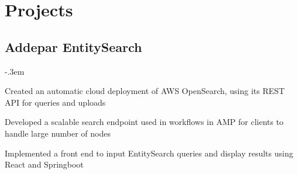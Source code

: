 \documentclass{article}
\let\olditemize=\itemize \let\endolditemize=\enditemize
\renewenvironment{itemize}{\olditemize[topsep=0em] \itemsep-.3em}{\endolditemize}
\newcommand{\entry}[3]{\quad\textbf{|\quad#1}\\#2\qquad#3}
\begin{document}

%
%

\section{Projects}

\subsection{Addepar EntitySearch}
\begin{itemize}
  \item Created an automatic cloud deployment of AWS OpenSearch, using its REST API for queries and uploads
  \item Developed a scalable search endpoint used in workflows in AMP for clients to handle large number of nodes
  \item Implemented a front end to input EntitySearch queries and display results using React and Springboot
\end{itemize}
\end{document}
